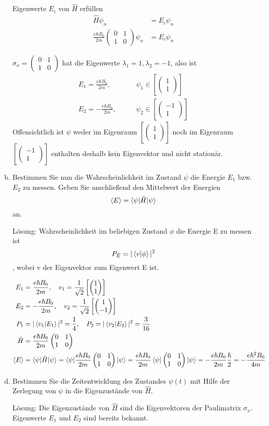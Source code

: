 \documentclass{scrartcl}
\newcommand{\Sx}{\begin{pmatrix}0&1\\1&0\end{pmatrix}}
\newcommand{\vecz}[2]{\begin{pmatrix}#1 \\ #2\end{pmatrix}}
\begin{document}
\begin{enumerate}[a)]
Eigenwerte $E_i$ von $\hat  H$ erfüllen
\begin{align*}
\hat H \psi_n						&= E_i \psi_n			\\
\frac{e\hbar B_0}{2m}\Sx \psi_n
&= 
E_i \psi_n
\end{align*}

$\sigma_x = \begin{pmatrix}0&1\\1&0\end{pmatrix}$ hat die Eigenwerte $\lambda_1 = 1, \lambda_2 = -1$, also ist
\begin{align*}
E_1 =  \frac{e\hbar B_0}{2m}, \qquad& \psi_1 \in \left[\vecz 11 \right]\\
E_2 = -\frac{e\hbar B_0}{2m}, \qquad& \psi_2 \in \left[\vecz {-1}1 \right]
\end{align*}
Offensichtlich ist $\psi$ weder im Eigenraum $\left[\vecz 11 \right]$ noch im Eigenraum $\left[\vecz {-1}1 \right]$ enthalten deshalb kein Eigenvektor und nicht stationär.


\item Bestimmen Sie nun die Wahrscheinlichkeit im Zustand $\psi$ die Energie $E_1$ bzw. $E_2$ zu messen. Geben Sie anschließend den Mittelwert der Energien
\[\braket{E} = \braket{\psi|\hat H|\psi}\]
an.
\item[Lösung:]Wahrscheinlichkeit im beliebigen Zustand $\phi$ die Energie E zu messen ist
\[P_E = |\braket{v|\phi}|^2\], wobei v der Eigenvektor zum Eigenwert E ist.

\begin{align*}
E_1 &=  \frac{e\hbar B_0}{2m}, \quad v_1 = \frac{1}{\sqrt 2} \left[\vecz 11 \right]\\
E_2 &= -\frac{e\hbar B_0}{2m}, \quad v_2 = \frac{1}{\sqrt{2}}\left[\vecz 1{-1} \right]\\
P_1 &= |\braket{v_1|E_1}|^2 = \frac{1}{4}, \quad P_2 = |\braket{v_2|E_2}|^2 = \frac{3}{16}\\
\hat H &= \frac{e\hbar B_0}{2m}\Sx \\
\braket{E} &= \braket{\psi|\hat H|\psi} = \braket{\psi|\frac{e\hbar B_0}{2m}\Sx|\psi} = \frac{e\hbar B_0}{2m}\braket{\psi|\Sx|\psi} = -\frac{e\hbar B_0}{2m}\frac \hbar 2 = -\frac{e\hbar^2 B_0}{4m}
\end{align*}

\item Bestimmen Sie die Zeitentwicklung des Zustandes $\psi(t)$ mit Hilfe der Zerlegung von $\psi$ in die Eigenzustände von $\hat H$.

\item[Lösung:]
Die Eigenzustände von $\hat H$ sind die Eigenvektoren der Paulimatrix $\sigma_x$. Eigenwerte $E_1$ und $E_2$ sind bereits bekannt.


\end{enumerate}
\end{document}
